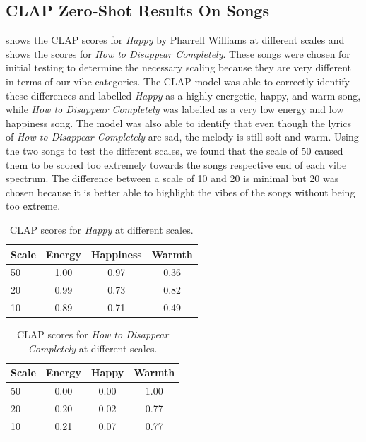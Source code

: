 \documentclass{article}
\begin{document}
\subsection{CLAP Zero-Shot Results On Songs}

 shows the CLAP scores for \emph{Happy} by Pharrell Williams 
at different scales and  shows the scores for 
\emph{How to Disappear Completely}. These songs were chosen for initial testing to 
determine the necessary scaling because they are very different in terms of our vibe 
categories. The CLAP model was able to correctly identify these differences and labelled
\emph{Happy} as a highly energetic, happy, and warm song, while 
\emph{How to Disappear Completely} was labelled as a very low energy and low happiness song.
The model was also able to identify that even though the lyrics of 
\emph{How to Disappear Completely} are sad, the melody is still soft and warm. 
Using the two songs to test the different scales, we found that the scale of 50 caused them 
to be scored too extremely towards the songs respective end of each vibe spectrum. 
The difference between a scale of 10 and 20 is minimal but 20 was chosen because it is 
better able to highlight the vibes of the songs without being too extreme.

\begin{table}[ht]
\centering
\setlength{\tabcolsep}{5pt}
\begin{tabular}{@{}lccc@{}}
\toprule
Scale & Energy & Happiness & Warmth \\
\midrule
50 & 1.00 & 0.97 & 0.36 \\
20 & 0.99 & 0.73 & 0.82 \\
10 & 0.89 & 0.71 & 0.49 \\
\bottomrule
\end{tabular}
\caption{CLAP scores for \emph{Happy} at different scales.}
\label{tab:happy_scores}
\end{table}


\begin{table}[ht]
\centering
\begin{tabular}{@{}lccc@{}}
\toprule
Scale & Energy & Happy & Warmth \\
\midrule
50 & 0.00 & 0.00 & 1.00 \\
20 & 0.20 & 0.02 & 0.77 \\
10 & 0.21 & 0.07 & 0.77 \\
\bottomrule
\end{tabular}
\caption{CLAP scores for \emph{How to Disappear Completely} at different scales.}
\label{tab:disappear_scores}
\end{table}
\end{document}
